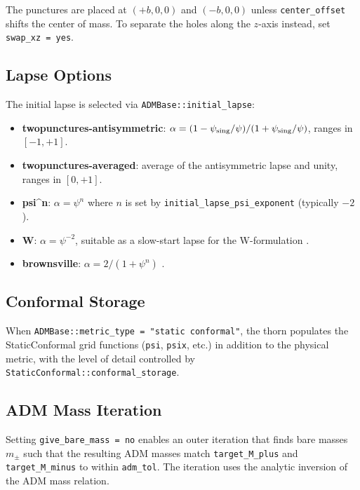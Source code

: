 The punctures are placed at $(+b, 0, 0)$ and $(-b, 0, 0)$ unless
\texttt{center\_offset} shifts the center of mass.  To separate the holes
along the $z$-axis instead, set \texttt{swap\_xz = yes}.

\subsection{Lapse Options}

The initial lapse is selected via \texttt{ADMBase::initial\_lapse}:
\begin{itemize}
  \item \textbf{twopunctures-antisymmetric}: $\alpha =
    (1 - \psi_{\rm sing}/\psi) / (1 + \psi_{\rm sing}/\psi)$, ranges in
    $[-1, +1]$.
  \item \textbf{twopunctures-averaged}: average of the antisymmetric lapse
    and unity, ranges in $[0, +1]$.
  \item \textbf{psi\^{}n}: $\alpha = \psi^n$ where $n$ is set by
    \texttt{initial\_lapse\_psi\_exponent} (typically $-2$).
  \item \textbf{W}: $\alpha = \psi^{-2}$, suitable as a slow-start lapse for
    the W-formulation \cite{einsteininitialdata_TwoPunctures_Alic24}.
  \item \textbf{brownsville}: $\alpha = 2/(1 + \psi^n)$
    \cite{einsteininitialdata_TwoPunctures_Campanelli06}.
\end{itemize}

\subsection{Conformal Storage}

When \texttt{ADMBase::metric\_type = "static conformal"}, the thorn populates
the StaticConformal grid functions (\texttt{psi}, \texttt{psix}, etc.) in
addition to the physical metric, with the level of detail controlled by
\texttt{StaticConformal::conformal\_storage}.

\subsection{ADM Mass Iteration}

Setting \texttt{give\_bare\_mass = no} enables an outer iteration that finds
bare masses $m_\pm$ such that the resulting ADM masses match
\texttt{target\_M\_plus} and \texttt{target\_M\_minus} to within
\texttt{adm\_tol}.  The iteration uses the analytic inversion of the ADM
mass relation.

